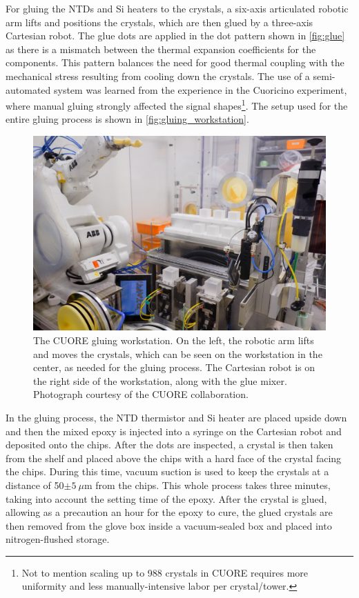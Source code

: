For gluing the NTDs and Si heaters to the crystals, a six-axis articulated robotic arm lifts and positions the crystals, which are then glued by a three-axis Cartesian robot.
The glue dots are applied in the dot pattern shown in \autoref{fig:glue} as there is a mismatch between the thermal expansion coefficients for the components.
This pattern balances the need for good thermal coupling with the mechanical stress resulting from cooling down the crystals.
The use of a semi-automated system was learned from the experience in the Cuoricino experiment, where manual gluing strongly affected the signal shapes\footnote{Not to mention scaling up to 988 crystals in CUORE requires more uniformity and less manually-intensive labor per crystal/tower.}.
The setup used for the entire gluing process is shown in \autoref{fig:gluing_workstation}.

\begin{figure}[htbp]
    \centering
    \includegraphics[width=0.7\linewidth]{Figures/cuore_gluing_pic1.jpg}
    \caption[The CUORE gluing workstation.]
    {The CUORE gluing workstation.
    On the left, the robotic arm lifts and moves the crystals, which can be seen on the workstation in the center, as needed for the gluing process.
    The Cartesian robot is on the right side of the workstation, along with the glue mixer.
    Photograph courtesy of the CUORE collaboration.}
    \label{fig:gluing_workstation}
\end{figure}

In the gluing process, the NTD thermistor and Si heater are placed upside down and then the mixed epoxy is injected into a syringe on the Cartesian robot and deposited onto the chips.
After the dots are inspected, a crystal is then taken from the shelf and placed above the chips with a hard face of the crystal facing the chips.
During this time, vacuum suction is used to keep the crystals at a distance of 50$\pm 5~\mu$m from the chips.
This whole process takes three minutes, taking into account the setting time of the epoxy.
After the crystal is glued, allowing as a precaution an hour for the epoxy to cure, the glued crystals are then removed from the glove box inside a vacuum-sealed box and placed into nitrogen-flushed storage.

